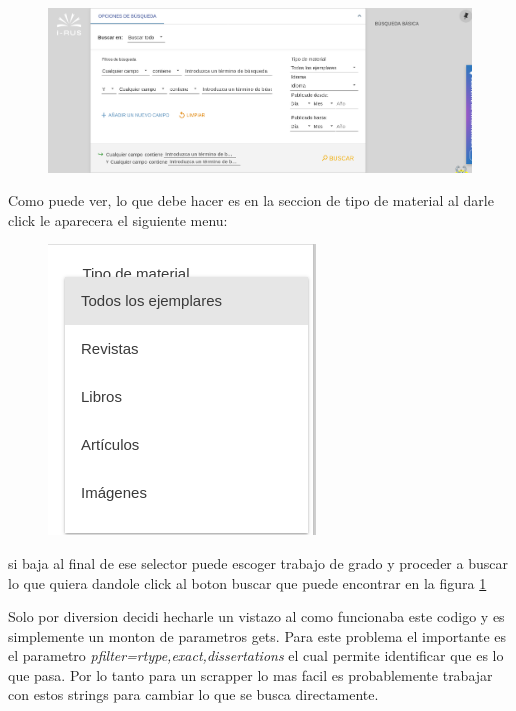 \documentclass[12pt]{exam}
\begin{document}
\begin{figure}[H]
    \centering
    \includegraphics[width=0.8\linewidth]{Figures/section_2_a_p1.png}
    \label{fig:busqueda-avanzada}
\end{figure}

Como puede ver, lo que debe hacer es en la seccion de tipo de material al darle click le aparecera el siguiente menu:

\begin{figure}[H]
    \centering
    \includegraphics[width=0.8\linewidth]{Figures/section_2_a_p2.png}
    \label{fig:sec_2_a_p2}
\end{figure}

si baja al final de ese selector puede escoger trabajo de grado y proceder a buscar lo que quiera dandole click al boton buscar que puede encontrar en la figura \ref{fig:busqueda-avanzada}

Solo por diversion decidi hecharle un vistazo al como funcionaba este codigo y es simplemente un monton de parametros gets. Para este problema el importante es el parametro \textit{pfilter=rtype,exact,dissertations} el cual permite identificar que es lo que pasa. Por lo tanto para un scrapper lo mas facil es probablemente trabajar con estos strings para cambiar lo que se busca directamente.
\end{document}
